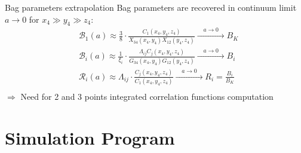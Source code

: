 \documentclass{beamer}
\begin{document}
\begin{frame}{Bag parameters extrapolation}
      Bag parameters are recovered in continuum limit $a \rightarrow 0$ for $x_4 \gg y_4 \gg z_4$:
      \begin{equation*}
            \begin{split}
                  & \mathcal{B}_1 (a) \approx \frac{3}{8}\cdot\frac{C_1(x_4,y_4,z_4)}{X_{34}(x_4,y_4)X_{12}(y_4,z_4)} \xrightarrow{ \quad a \rightarrow 0 \quad } B_K \\
                  & \mathcal{B}_i (a) \approx \frac{1}{\xi_i}\cdot\frac{\Lambda_{ij}C_j(x_4,y_4,z_4)}{G_{34}(x_4,y_4)G_{12}(y_4,z_4)} \xrightarrow{ \quad a \rightarrow 0 \quad } B_i \\
                  & \mathcal{R}_i (a) \approx \Lambda_{ij}\cdot\frac{C_j(x_4,y_4,z_4)}{C_1(x_4,y_4,z_4)}\xrightarrow{ \quad a \rightarrow 0 \quad } R_i = \frac{B_i}{B_K} \\
            \end{split}
      \end{equation*}
      $\Rightarrow$ Need for 2 and 3 points integrated correlation functions computation
\end{frame}

\section{Simulation Program}
\end{document}
